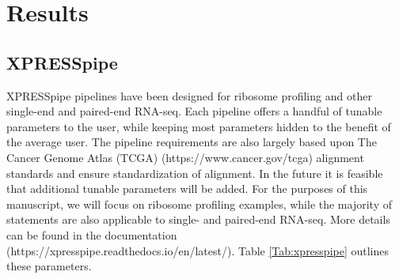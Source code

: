\documentclass[11pt, a4paper, oneside]{article}
\begin{document}
\section{Results}

\subsection{XPRESSpipe}
XPRESSpipe pipelines have been designed for ribosome profiling and other single-end and paired-end RNA-seq. Each pipeline offers a handful of tunable parameters to the user, while keeping most parameters hidden to the benefit of the average user. The pipeline requirements are also largely based upon The Cancer Genome Atlas (TCGA) (https://www.cancer.gov/tcga) alignment standards and ensure standardization of alignment. In the future it is feasible that additional tunable parameters will be added. For the purposes of this manuscript, we will focus on ribosome profiling examples, while the majority of statements are also applicable to single- and paired-end RNA-seq. More details can be found in the documentation (https://xpresspipe.readthedocs.io/en/latest/). Table \ref{Tab:xpresspipe} outlines these parameters.
\end{document}

